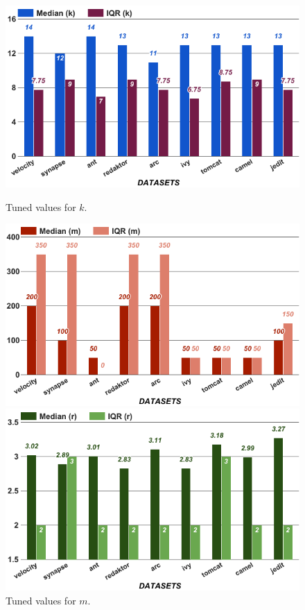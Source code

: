 \begin{figure}[!t]
    \centering
    \begin{minipage}{.33\textwidth}
        \captionsetup{justification=centering,singlelinecheck=off}
        \includegraphics[width=.95\linewidth]{./fig/k.png}
        \caption{Tuned values for $k$.}
        \label{RQ3:k}
    \end{minipage}%
    \begin{minipage}{.33\textwidth}
        \captionsetup{labelsep=space,justification=centering,singlelinecheck=off}
        \includegraphics[width=.95\linewidth]{./fig/m.png}
        \caption{Tuned values for $m$.}
        \label{RQ3:a}
    \end{minipage}
    \begin{minipage}{.33\textwidth}
        \captionsetup{labelsep=space,justification=centering,singlelinecheck=off}
        \includegraphics[width=.95\linewidth]{./fig/r.png}

\end{minipage}
\end{figure}
